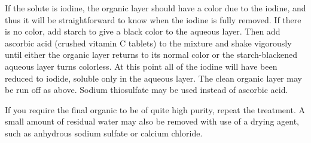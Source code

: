 If the solute is iodine, 
the organic layer should have a color due to the iodine, 
and thus it will be straightforward 
to know when the iodine is fully removed. 
If there is no color, 
add starch to give a black color to the aqueous layer. 
Then add ascorbic acid (crushed vitamin C tablets) 
to the mixture and shake vigorously 
until either the organic layer returns to its normal color 
or the starch-blackened aqueous layer turns colorless. 
At this point all of the iodine will have been reduced to iodide, 
soluble only in the aqueous layer. 
The clean organic layer may be run off as above. 
Sodium thiosulfate may be used instead of ascorbic acid.

If you require the final organic to be of quite high purity, 
repeat the treatment. 
A small amount of residual water 
may also be removed with use of a drying agent, 
such as anhydrous sodium sulfate or calcium chloride.

